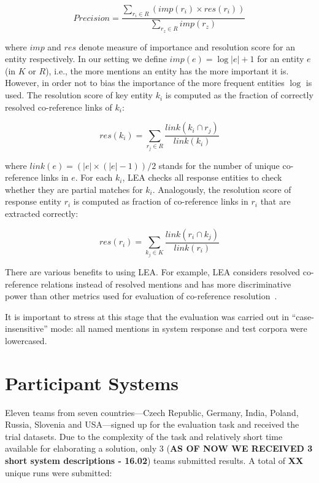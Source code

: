 \documentclass[11pt]{article}
\begin{document}
\begin{equation*}
	\mathit{Precision} = \frac{\sum_{r_{i} \in R} (\mathit{imp}(r_i) \times \mathit{res}(r_{i}))}
              {\sum_{r_{z} \in R} imp(r_{z})}
\end{equation*}

\noindent where $\mathit{imp}$ and $\mathit{res}$ denote measure of importance and resolution score for an entity respectively.
In our setting we define $\mathit{imp}(e) = \log|e|+1$ for an entity $e$ (in $K$ or $R$), i.e., the more mentions 
an entity has the more important it is. However, in order not to bias the importance of the more frequent entities $\log$ 
is used. The resolution score of key entity $k_i$ is computed as the fraction of correctly resolved co-reference 
links of $k_i$: 

\begin{equation*}
	\mathit{res}(k_i) = \sum_{r_{j} \in R} \frac{\mathit{link}(k_{i} \cap r_{j})}{\mathit{link}(k_{i})}
\end{equation*}

\noindent where $\mathit{link}(e) = (|e| \times (|e|-1))/2$ stands for the number of unique 
co-reference links in $e$. For each $k_i$, LEA checks all response entities to check whether 
they are partial matches for $k_i$. Analogously, the resolution score of response entity $r_i$ is
computed as fraction of co-reference links in $r_i$ that are extracted correctly:

\begin{equation*}
	\mathit{res}(r_i) = \sum_{k_{j} \in K} \frac{\mathit{link}(r_{i} \cap k_{j})}{\mathit{link}(r_{i})}
\end{equation*}

There are various benefits to using LEA.  For example, LEA considers
resolved co-reference relations instead of resolved mentions and has more
discriminative power than other metrics used for evaluation of
co-reference resolution~\cite{DBLP:conf-acl-Moosavi016}.

It is important to stress at this stage that the evaluation was carried
out in ``case-insensitive'' mode: all named mentions in system response
and test corpora were lowercased.




\section{Participant Systems}
\label{sec:participants}
 
Eleven teams from seven countries---Czech Republic, Germany, India,
Poland, Russia, Slovenia and USA---signed up for the evaluation task and
received the trial datasets.  Due to the complexity of the task and
relatively short time available for elaborating a solution, only 3
(\textbf{AS OF NOW WE RECEIVED 3 short system descriptions - 16.02})
teams submitted results.
%
A total of \textbf{XX} unique runs were submitted: 
%
\end{document}
